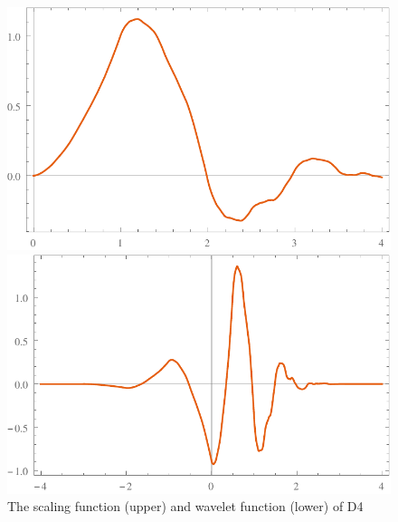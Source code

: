 \documentclass{book}
\begin{document}
\

\begin{figure}[h]
  \includegraphics{Figures/D4WaveletPhi.pdf}
  
  \includegraphics{Figures/D4WaveletPsi.pdf}
  \caption{The scaling function (upper) and wavelet function (lower) of D4}
\end{figure}

\
\end{document}
